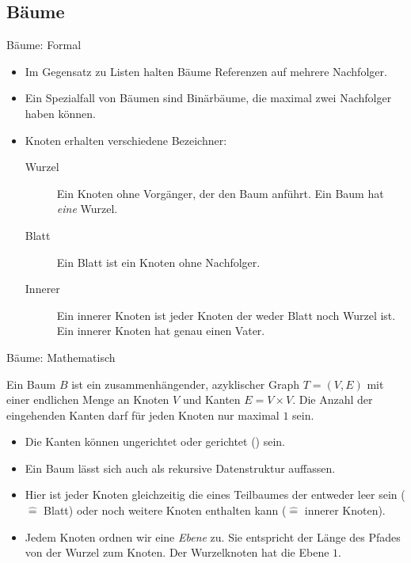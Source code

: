 \subsection{Bäume}

\begin{frame}{Bäume: Formal}
    \begin{itemize}[<+(1)->]
        \widei
        \item Im Gegensatz zu Listen halten Bäume Referenzen auf mehrere Nachfolger.
        \item Ein Spezialfall von Bäumen sind Binärbäume, die maximal zwei Nachfolger haben können.
        \item Knoten erhalten verschiedene Bezeichner: \begin{description}
            \item[Wurzel] Ein Knoten ohne Vorgänger, der den Baum anführt. Ein Baum hat \emph{eine} Wurzel.
            \item[Blatt] Ein Blatt ist ein Knoten ohne Nachfolger.
            \item[Innerer] Ein innerer Knoten ist jeder Knoten der weder Blatt noch Wurzel ist.\pause{} Ein innerer Knoten hat genau einen Vater.
        \end{description}
    \end{itemize}
\end{frame}

\begin{frame}{Bäume: Mathematisch}
    \begin{definition}[Baum]
Ein Baum \(B\) ist ein zusammenhängender, azyklischer Graph \(T = (V,E)\) mit einer endlichen Menge an Knoten \(V\) und Kanten \(E = V \times V\).\pause{} Die Anzahl der eingehenden Kanten darf für jeden Knoten nur maximal \(1\) sein.
    \end{definition}
    \begin{itemize}[<+(1)->]
        \item Die Kanten können ungerichtet oder gerichtet () sein.
        \item Ein Baum lässt sich auch als rekursive Datenstruktur auffassen.
        \item Hier ist jeder Knoten gleichzeitig die  eines Teilbaumes\pause{} der entweder leer sein (\(\widehat{=}\) Blatt)\pause{} oder noch weitere Knoten enthalten kann (\(\widehat{=}\) innerer Knoten).
        \item Jedem Knoten ordnen wir eine \emph{Ebene} zu. \pause{}Sie entspricht der Länge des Pfades von der Wurzel zum Knoten.\pause{} Der Wurzelknoten hat die Ebene \(1\).
    \end{itemize}
\end{frame}


